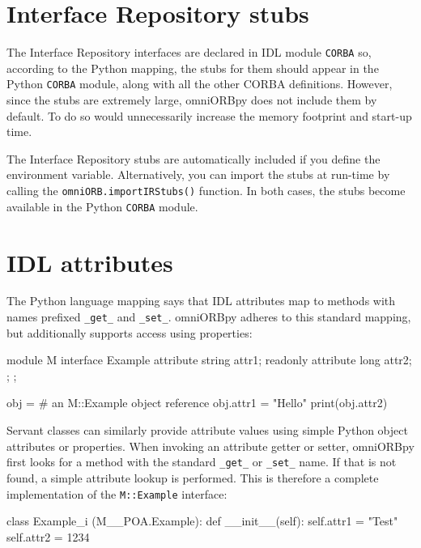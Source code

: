 \documentclass[11pt,oneside,a4paper]{book}
\newcommand{\module}[1]{\texttt{#1}}
\newcommand{\code}[1]{\texttt{#1}}
\newcommand{\op}[1]{\texttt{#1()}}
\begin{document}
\section{Interface Repository stubs}
\label{sec:ifrstubs}

The Interface Repository interfaces are declared in IDL module
\module{CORBA} so, according to the Python mapping, the stubs for them
should appear in the Python \module{CORBA} module, along with all the
other CORBA definitions. However, since the stubs are extremely large,
omniORBpy does not include them by default. To do so would
unnecessarily increase the memory footprint and start-up time.

The Interface Repository stubs are automatically included if you
define the  environment variable.
Alternatively, you can import the stubs at run-time by calling the
\op{omniORB.importIRStubs} function. In both cases, the stubs become
available in the Python \module{CORBA} module.


\section{IDL attributes}
\label{sec:attributes}

The Python language mapping says that IDL attributes map to methods
with names prefixed \code{\_get\_} and \code{\_set\_}. omniORBpy
adheres to this standard mapping, but additionally supports access
using properties:

\begin{idllisting}
module M {
  interface Example {
    attribute string attr1;
    readonly attribute long attr2;
  };
};
\end{idllisting}

\begin{pylisting}
obj = # an M::Example object reference
obj.attr1 = "Hello"
print(obj.attr2)
\end{pylisting}

Servant classes can similarly provide attribute values using simple
Python object attributes or properties. When invoking an attribute
getter or setter, omniORBpy first looks for a method with the standard
\code{\_get\_} or \code{\_set\_} name. If that is not found, a simple
attribute lookup is performed. This is therefore a complete
implementation of the \code{M::Example} interface:

\begin{pylisting}
class Example_i (M__POA.Example):
    def __init__(self):
        self.attr1 = "Test"
        self.attr2 = 1234
\end{pylisting}
\end{document}
